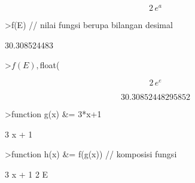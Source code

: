 \documentclass[12pt,arial,letterpaper]{book}
\begin{document}
\begin{eulercomment}
\begin{eulercomment}
\begin{eulercomment}
\begin{eulercomment}
\begin{eulercomment}
\begin{eulercomment}
\begin{eulercomment}
\begin{eulercomment}
\begin{eulercomment}
\begin{eulercomment}
\begin{eulercomment}
\begin{eulercomment}
\begin{eulercomment}
\begin{eulercomment}
\begin{eulercomment}
\begin{eulercomment}
\begin{eulercomment}
\begin{eulercomment}
\begin{euleroutput}
\end{euleroutput}
\begin{eulerformula}
\[
2\,e^{a}
\]
\end{eulerformula}
\begin{eulerprompt}
>f(E) // nilai fungsi berupa bilangan desimal
\end{eulerprompt}
\begin{euleroutput}
  30.308524483
\end{euleroutput}
\begin{eulerprompt}
>$f(E), $float(%
\end{eulerprompt}
\begin{eulerformula}
\[
2\,e^{e}
\]
\end{eulerformula}
\begin{eulerformula}
\[
30.30852448295852
\]
\end{eulerformula}
\begin{eulerprompt}
>function g(x) &= 3*x+1
\end{eulerprompt}
\begin{euleroutput}
  
                                 3 x + 1
  
\end{euleroutput}
\begin{eulerprompt}
>function h(x) &= f(g(x)) // komposisi fungsi
\end{eulerprompt}
\begin{euleroutput}
  
                                   3 x + 1
                                2 E
  

\end{euleroutput}
\end{eulercomment}
\end{eulercomment}
\end{eulercomment}
\end{eulercomment}
\end{eulercomment}
\end{eulercomment}
\end{eulercomment}
\end{eulercomment}
\end{eulercomment}
\end{eulercomment}
\end{eulercomment}
\end{eulercomment}
\end{eulercomment}
\end{eulercomment}
\end{eulercomment}
\end{eulercomment}
\end{eulercomment}
\end{eulercomment}
\end{document}
